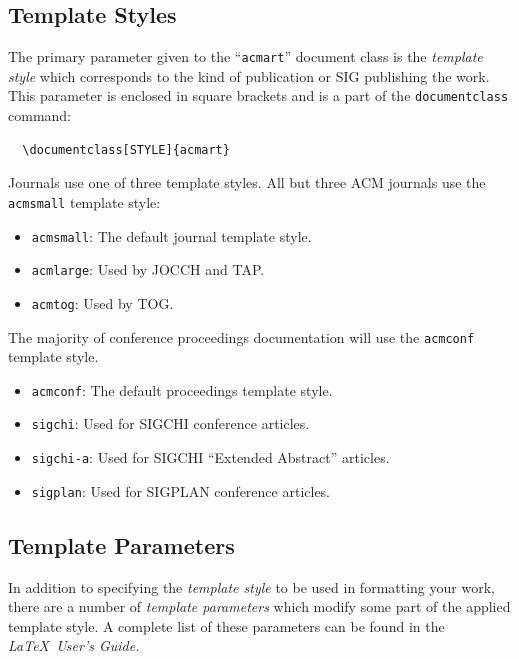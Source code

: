 \documentclass[sigconf, authordraft]{acmart}
\begin{document}
	\subsection{Template Styles}


	The primary parameter given to the ``\verb|acmart|'' document class is the {\itshape template style}
	which corresponds to the kind of publication or SIG publishing the work. This
	parameter is enclosed in square brackets and is a part of the
	{\verb|documentclass|} command: \begin{verbatim}
  \documentclass[STYLE]{acmart}
\end{verbatim}

	Journals use one of three template styles. All but three ACM journals use the {\verb|acmsmall|}
	template style:
	\begin{itemize}
		\item {\verb|acmsmall|}: The default journal template style.

		\item {\verb|acmlarge|}: Used by JOCCH and TAP.

		\item {\verb|acmtog|}: Used by TOG.
	\end{itemize}

	The majority of conference proceedings documentation will use the {\verb|acmconf|}
	template style.
	\begin{itemize}
		\item {\verb|acmconf|}: The default proceedings template style.

		\item {\verb|sigchi|}: Used for SIGCHI conference articles.

		\item {\verb|sigchi-a|}: Used for SIGCHI ``Extended Abstract'' articles.

		\item {\verb|sigplan|}: Used for SIGPLAN conference articles.
	\end{itemize}

	\subsection{Template Parameters}


	In addition to specifying the {\itshape template style} to be used in formatting
	your work, there are a number of {\itshape template parameters} which modify
	some part of the applied template style. A complete list of these parameters can
	be found in the {\itshape \LaTeX\ User's Guide.}
\end{document}
